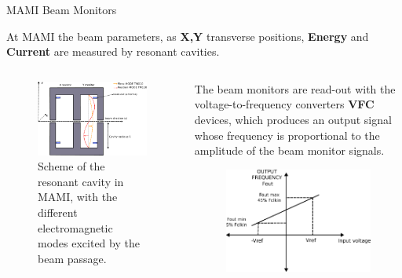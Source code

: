 \documentclass[9pt,a4paper]{beamer}
\begin{document}
\begin{frame}[t]{MAMI Beam Monitors}

At MAMI the beam parameters, as \textbf{X,Y} transverse positions, \textbf{Energy} and \textbf{Current} are measured by resonant cavities.

\begin{columns}
\begin{column}{0.5\textwidth}
\begin{center}
\begin{figure}
\includegraphics[width = 1\textwidth]{figures/Monitors.pdf}
\caption{Scheme of the resonant cavity in MAMI, with the different electromagnetic modes excited by the beam passage.}
\end{figure}
\end{center}
\end{column}
\begin{column}{0.5\textwidth}
The beam monitors are read-out with the voltage-to-frequency converters \textbf{VFC} devices, which produces an output signal whose frequency is proportional to the amplitude of the beam monitor signals. 
\begin{figure}
\includegraphics[width = 1\textwidth]{figures/Vfc.pdf}
\end{figure}
\end{column}
\end{columns}
\end{frame}
\end{document}

